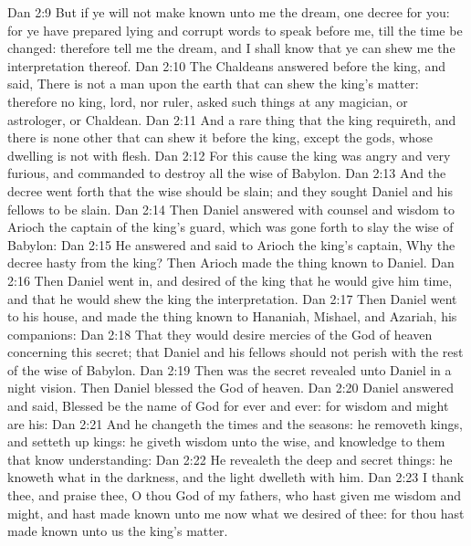 \vs Dan 2:9 But if ye will not make known unto me the dream,  one decree for you: for ye have prepared lying and corrupt words to speak before me, till the time be changed: therefore tell me the dream, and I shall know that ye can shew me the interpretation thereof.
\vs Dan 2:10 The Chaldeans answered before the king, and said, There is not a man upon the earth that can shew the king's matter: therefore  no king, lord, nor ruler,  asked such things at any magician, or astrologer, or Chaldean.
\vs Dan 2:11 And  a rare thing that the king requireth, and there is none other that can shew it before the king, except the gods, whose dwelling is not with flesh.
\vs Dan 2:12 For this cause the king was angry and very furious, and commanded to destroy all the wise  of Babylon.
\vs Dan 2:13 And the decree went forth that the wise  should be slain; and they sought Daniel and his fellows to be slain.
\vs Dan 2:14 Then Daniel answered with counsel and wisdom to Arioch the captain of the king's guard, which was gone forth to slay the wise  of Babylon:
\vs Dan 2:15 He answered and said to Arioch the king's captain, Why  the decree  hasty from the king? Then Arioch made the thing known to Daniel.
\vs Dan 2:16 Then Daniel went in, and desired of the king that he would give him time, and that he would shew the king the interpretation.
\vs Dan 2:17 Then Daniel went to his house, and made the thing known to Hananiah, Mishael, and Azariah, his companions:
\vs Dan 2:18 That they would desire mercies of the God of heaven concerning this secret; that Daniel and his fellows should not perish with the rest of the wise  of Babylon.
\vs Dan 2:19 Then was the secret revealed unto Daniel in a night vision. Then Daniel blessed the God of heaven.
\vs Dan 2:20 Daniel answered and said, Blessed be the name of God for ever and ever: for wisdom and might are his:
\vs Dan 2:21 And he changeth the times and the seasons: he removeth kings, and setteth up kings: he giveth wisdom unto the wise, and knowledge to them that know understanding:
\vs Dan 2:22 He revealeth the deep and secret things: he knoweth what  in the darkness, and the light dwelleth with him.
\vs Dan 2:23 I thank thee, and praise thee, O thou God of my fathers, who hast given me wisdom and might, and hast made known unto me now what we desired of thee: for thou hast  made known unto us the king's matter.
